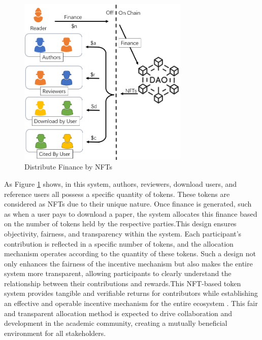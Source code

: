 \documentclass[lettersize,journal]{IEEEtran}
\begin{document}
\begin{figure}[h]
  \centering
  \includegraphics[width=3.2in]{assets/finance.png}
  \caption{Distribute Finance by NFTs}
  \label{fig:financenft}
\end{figure}

As Figure \ref{fig:financenft} shows, in this system, authors, reviewers, download users, and reference users all possess a specific quantity of tokens. These tokens are considered as NFTs due to their unique nature. Once finance is generated, such as when a user pays to download a paper, the system allocates this finance based on the number of tokens held by the respective parties.This design ensures objectivity, fairness, and transparency within the system. Each participant's contribution is reflected in a specific number of tokens, and the allocation mechanism operates according to the quantity of these tokens. Such a design not only enhances the fairness of the incentive mechanism but also makes the entire system more transparent, allowing participants to clearly understand the relationship between their contributions and rewards.This NFT-based token system provides tangible and verifiable returns for contributors while establishing an effective and operable incentive mechanism for the entire ecosystem \cite{kong2021alternative}. This fair and transparent allocation method is expected to drive collaboration and development in the academic community, creating a mutually beneficial environment for all stakeholders.

\end{document}
